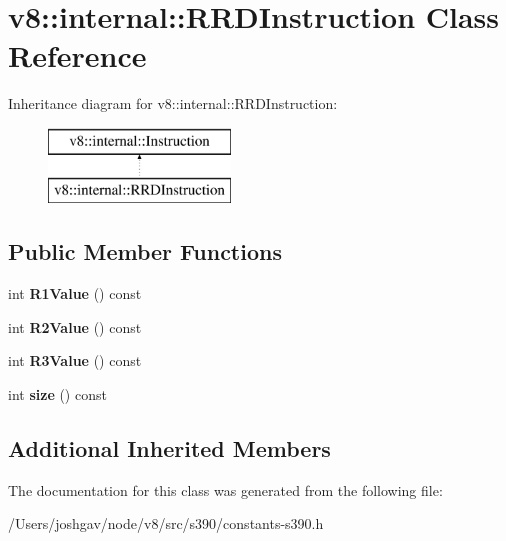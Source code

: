 \hypertarget{classv8_1_1internal_1_1_r_r_d_instruction}{}\section{v8\+:\+:internal\+:\+:R\+R\+D\+Instruction Class Reference}
\label{classv8_1_1internal_1_1_r_r_d_instruction}
Inheritance diagram for v8\+:\+:internal\+:\+:R\+R\+D\+Instruction\+:\begin{figure}[H]
\begin{center}
\leavevmode
\includegraphics[height=2.000000cm]{classv8_1_1internal_1_1_r_r_d_instruction}
\end{center}
\end{figure}
\subsection*{Public Member Functions}
\begin{DoxyCompactItemize}
\item 
int {\bfseries R1\+Value} () const \hypertarget{classv8_1_1internal_1_1_r_r_d_instruction_ad88f33de90387ec298fa5410d131def5}{}\label{classv8_1_1internal_1_1_r_r_d_instruction_ad88f33de90387ec298fa5410d131def5}

\item 
int {\bfseries R2\+Value} () const \hypertarget{classv8_1_1internal_1_1_r_r_d_instruction_a3ff3be52b976e6fb820427027695f695}{}\label{classv8_1_1internal_1_1_r_r_d_instruction_a3ff3be52b976e6fb820427027695f695}

\item 
int {\bfseries R3\+Value} () const \hypertarget{classv8_1_1internal_1_1_r_r_d_instruction_af6a690cdb227c74d487053c12ca1e5d1}{}\label{classv8_1_1internal_1_1_r_r_d_instruction_af6a690cdb227c74d487053c12ca1e5d1}

\item 
int {\bfseries size} () const \hypertarget{classv8_1_1internal_1_1_r_r_d_instruction_a7efcce6236671a92afafea610f68f8fd}{}\label{classv8_1_1internal_1_1_r_r_d_instruction_a7efcce6236671a92afafea610f68f8fd}

\end{DoxyCompactItemize}
\subsection*{Additional Inherited Members}


The documentation for this class was generated from the following file\+:\begin{DoxyCompactItemize}
\item 
/\+Users/joshgav/node/v8/src/s390/constants-\/s390.\+h\end{DoxyCompactItemize}
